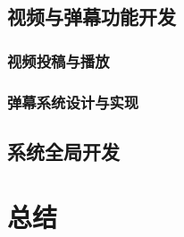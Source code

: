 \subsection{视频与弹幕功能开发}

\subsubsection{视频投稿与播放}

\subsubsection{弹幕系统设计与实现}

\subsection{系统全局开发}

\newpage

\section{总结}

\newpage
